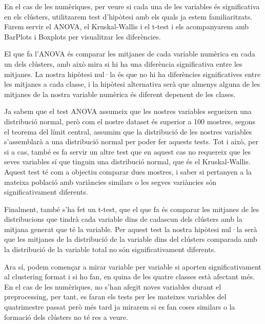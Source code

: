 En el cas de les numèriques, per veure si cada una de les variables és significativa en els clústers, utilitzarem test d'hipòtesi amb els quals ja estem familiaritzats. Farem servir el ANOVA, el Kruskal-Wallis i el t-test i els acompanyarem amb BarPlots i Boxplots per visualitzar les diferències.

El que fa l'ANOVA és comparar les mitjanes de cada variable numèrica en cada un dels clústers, amb això mira si hi ha una diferència significativa entre les mitjanes. La nostra hipòtesi nul·la és que no hi ha diferències significatives entre les mitjanes a cada classe, i la hipòtesi alternativa serà que almenys alguna de les mitjanes de la nostra variable numèrica és diferent depenent de les clases. 

Ja sabem que el test ANOVA assumeix que les nostres variables segueixen una distribució normal, però com el nostre dataset és superior a 100 mostres, segons el teorema del límit central, assumim que la distribució de les nostres variables s'assemblarà a una distribució normal per poder fer aquests tests. Tot i això, per si a cas, també es fa servir un altre test que en aquest cas no requereix que les seves variables sí que tinguin una distribució normal, que és el Kruskal-Wallis. Aquest test té com a objectiu comparar dues mostres, i saber si pertanyen a la mateixa població amb variàncies similars o les segves variàncies són significativament diferents. 

Finalment, també s'ha fet un t-test, que el que fa és comparar les mitjanes de les distribucions que tindrà cada variable dins de cadascun dels clústers amb la mitjana generat que té la variable. Per aquest test la nostra hipòtesi nul·la serà que les mitjanes de la distribució de la variable dins del clústers comparada amb la distribució de la variable total no són significativament diferents. 

Ara sí, podem començar a mirar variable per variable si aporten significativament al clustering format i si ho fan, en quina de les quatre classes està afectant més. En el cas de les numèriques, no s'han afegit noves variables durant el preprocessing, per tant, es faran els tests per les mateixes variables del quatrimestre passat però més tard ja mirarem si es fan coses similars o la formació dels clústers no té res a veure. 

